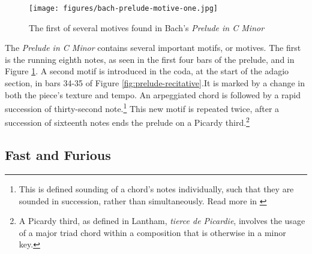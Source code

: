 \begin{figure}
    \centering
    \texttt{[image: figures/bach-prelude-motive-one.jpg]}
    \caption{The first of several motives found in Bach's \textit{Prelude in C Minor}}
    \label{fig:bach-first-motive}
\end{figure}

The \textit{Prelude in C Minor} contains several important motifs, or motives. The first is the running eighth notes, as seen in the first four bars of the prelude, and in Figure \ref{fig:bach-first-motive}\autocite{Henle_2009}. A second motif is introduced in the coda, at the start of the adagio section, in bars 34-35 of Figure \ref{fig:prelude-recitative}\autocite{Henle_2009}.It is marked by a change in both the piece's texture and tempo. An arpeggiated chord is followed by a rapid succession of thirty-second note.\footnote{This is defined sounding of a chord's notes individually, such that they are sounded in succession, rather than simultaneously. Read more in \cite{Arpeggio_2001}} This new motif is repeated twice, after a succession of sixteenth notes ends the prelude on a Picardy third.\footnote{A Picardy third, as defined in Lantham, \textit{tierce de Picardie}, involves the usage of a major triad chord within a composition that is otherwise in a minor key.}

\subsection{Fast and Furious}

